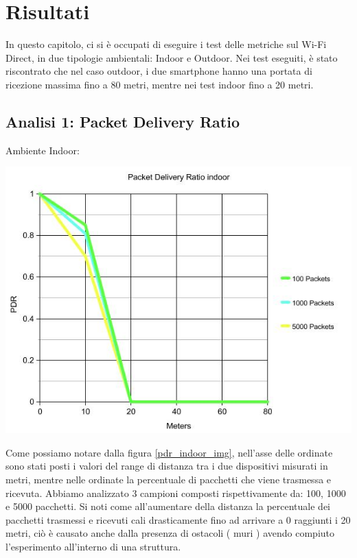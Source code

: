 \chapter{Risultati}
In questo capitolo, ci si è occupati di eseguire i test delle metriche sul Wi-Fi Direct, in due tipologie ambientali: Indoor e Outdoor. 
Nei test eseguiti, è stato riscontrato che nel caso outdoor, i due smartphone hanno una portata di ricezione massima fino a 80 metri, mentre nei test indoor fino a 20 metri.
\newpage

\section{Analisi 1: Packet Delivery Ratio}

Ambiente Indoor:
\begin{center}
\includegraphics[width=1\textwidth]{imgs/PDR_Indoor_New.jpg}
\label{pdr_indoor_img}%
\end{center}

Come possiamo notare dalla figura \ref{pdr_indoor_img}, nell'asse delle ordinate sono stati posti i valori del range di distanza tra i due dispositivi misurati in metri, mentre nelle ordinate la percentuale di pacchetti che viene trasmessa e ricevuta.
Abbiamo analizzato 3 campioni composti rispettivamente da: 100, 1000 e 5000 pacchetti.
Si noti come all'aumentare della distanza la percentuale dei pacchetti trasmessi e ricevuti cali drasticamente fino ad arrivare a 0 raggiunti i 20 metri, ciò è causato anche dalla presenza di ostacoli ( muri ) avendo compiuto l'esperimento all'interno di una struttura.

